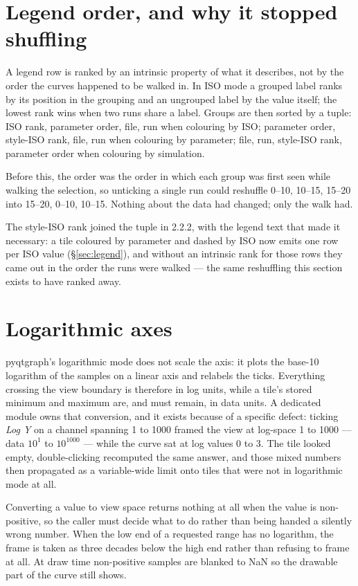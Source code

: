 \documentclass[11pt,a4paper,oneside]{report}
\newcommand{\appver}{2.2.2}
\begin{document}
\section{Legend order, and why it stopped shuffling}

A legend row is ranked by an intrinsic property of what it describes, not by the
order the curves happened to be walked in. In ISO mode a grouped label ranks by
its position in the grouping and an ungrouped label by the value itself; the
lowest rank wins when two runs share a label. Groups are then sorted by a tuple:
ISO rank, parameter order, file, run when colouring by ISO; parameter order,
style-ISO rank, file, run when colouring by parameter; file, run, style-ISO
rank, parameter order when colouring by simulation.

Before this, the order was the order in which each group was first seen while
walking the selection, so unticking a single run could reshuffle 0--10, 10--15,
15--20 into 15--20, 0--10, 10--15. Nothing about the data had changed; only the
walk had.

The style-ISO rank joined the tuple in \appver, with the legend text that made
it necessary: a tile coloured by parameter and dashed by ISO now emits one row
per ISO value (\S\ref{sec:legend}), and without an intrinsic rank for those rows
they came out in the order the runs were walked --- the same reshuffling this
section exists to have ranked away.

\section{Logarithmic axes}

pyqtgraph's logarithmic mode does not scale the axis: it plots the base-10
logarithm of the samples on a linear axis and relabels the ticks. Everything
crossing the view boundary is therefore in log units, while a tile's stored
minimum and maximum are, and must remain, in data units. A dedicated module owns
that conversion, and it exists because of a specific defect: ticking \emph{Log
Y} on a channel spanning 1 to 1000 framed the view at log-space 1 to 1000 ---
data $10^1$ to $10^{1000}$ --- while the curve sat at log values 0 to 3. The
tile looked empty, double-clicking recomputed the same answer, and those mixed
numbers then propagated as a variable-wide limit onto tiles that were not in
logarithmic mode at all.

Converting a value to view space returns nothing at all when the value is
non-positive, so the caller must decide what to do rather than being handed a
silently wrong number. When the low end of a requested range has no logarithm,
the frame is taken as three decades below the high end rather than refusing to
frame at all. At draw time non-positive samples are blanked to NaN so the
drawable part of the curve still shows.
\end{document}
